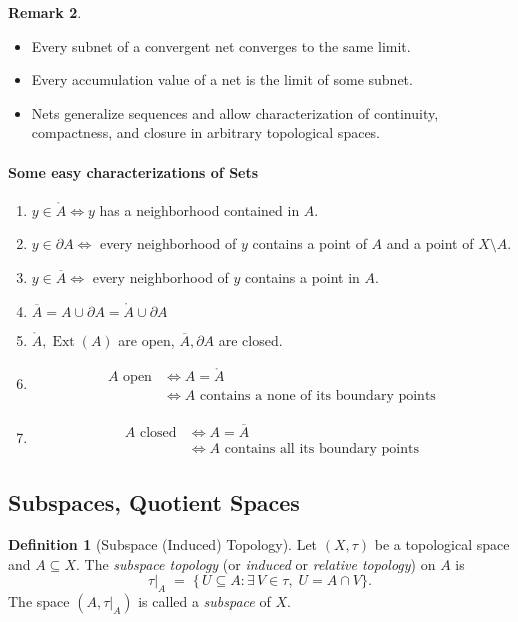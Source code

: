 \documentclass[11pt,a4paper]{article}
\theoremstyle{definition}
\newtheorem{definition}{Definition}[section]
\newtheorem{remark}[definition]{Remark}
\theoremstyle{plain}
\theoremstyle{remark}
\begin{document}
\begin{remark}
\begin{itemize}
  \item Every subnet of a convergent net converges to the same limit.
  \item Every accumulation value of a net is the limit of some subnet.
  \item Nets generalize sequences and allow characterization of continuity, compactness, and closure in arbitrary topological spaces.
\end{itemize}

\paragraph{Some easy characterizations of Sets} 
\begin{enumerate}[label = (\alph*)]
  \item $y \in \mathring{A} \iff y$ has a neighborhood contained in $A$. 
  \item $y \in \partial A \iff$ every neighborhood of $y$ contains a point of $A$ and 
  a point of $X \setminus A$. 
  \item $y \in \overline{A} \iff$ every neighborhood of $y$ contains a point in $A$. 
  \item $\overline{A} = A \cup \partial A = \mathring{A} \cup \partial A$ 
  \item $\mathring{A}, \operatorname{Ext}(A)$ are open, $\overline{A}, \partial A$ are closed. 
  \item \begin{align*}
    A \text{ open} &\iff A = \mathring{A} \\
    &\iff A \text{ contains a none of its boundary points}
  \end{align*}
  \item \begin{align*}
    A \text{ closed} &\iff A = \overline{A} \\
    &\iff A \text{ contains all its boundary points}
  \end{align*}
\end{enumerate}

\subsection{Subspaces, Quotient Spaces} 

\begin{definition}[Subspace (Induced) Topology]
Let \((X,\tau)\) be a topological space and \(A\subseteq X\).  The \emph{subspace topology} (or \emph{induced} or \emph{relative topology}) on \(A\) is
\[
  \tau|_A \;=\;\{\,U\subseteq A : \exists\,V\in\tau,\;U = A\cap V\}.
\]
The space \((A,\tau|_A)\) is called a \emph{subspace} of \(X\).
\end{definition}


\end{remark}
\end{document}
